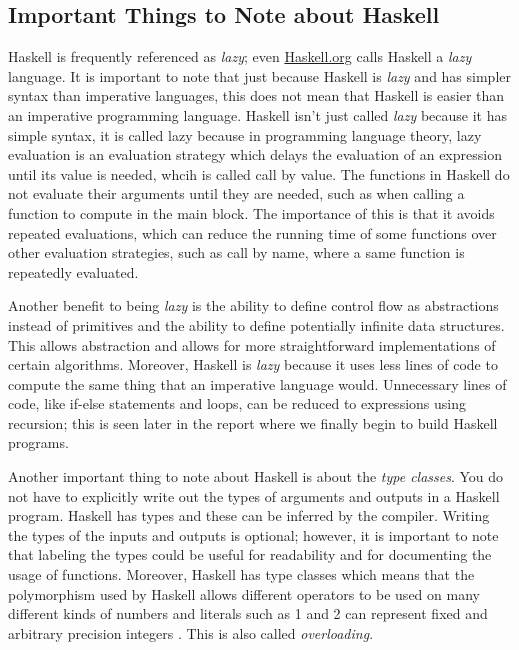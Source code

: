 \documentclass{article}
\begin{document}
\subsection{Important Things to Note about Haskell}
Haskell is frequently referenced as \textit{lazy}; even \href{https://www.haskell.org}{Haskell.org} calls Haskell a \textit{lazy} language. It is important to note that just because Haskell is \textit{lazy} and has simpler syntax than imperative languages, this does not mean that Haskell is easier than an imperative programming language. Haskell isn't just called \textit{lazy} because it has simple syntax, it is called lazy because in programming language theory, lazy evaluation is an evaluation strategy which delays the evaluation of an expression until its value is needed, whcih is called call by value\cite{20}. The functions in Haskell do not evaluate their arguments until they are needed, such as when calling a function to compute in the main block. The importance of this is that it avoids repeated evaluations, which can reduce the running time of some functions over other evaluation strategies, such as call by name, where a same function is repeatedly evaluated. 

\vspace{\baselineskip}
Another benefit to being \textit{lazy} is the ability to define control flow as abstractions instead of primitives and the ability to define potentially infinite data structures. This allows abstraction and allows for more straightforward implementations of certain algorithms. Moreover, Haskell is \textit{lazy} because it uses less lines of code to compute the same thing that an imperative language would. Unnecessary lines of code, like if-else statements and loops, can be reduced to expressions using recursion; this is seen later in the report where we finally begin to build Haskell programs.

\vspace{\baselineskip}
Another important thing to note about Haskell is about the \textit{type classes}. You do not have to explicitly write out the types of arguments and outputs in a Haskell program. Haskell has types and these can be inferred by the compiler. Writing the types of the inputs and outputs is optional; however, it is important to note that labeling the types could be useful for readability and for documenting the usage of functions. Moreover, Haskell has type classes which means that the polymorphism used by Haskell allows different operators to be used on many different kinds of numbers and literals such as 1 and 2 can represent fixed and arbitrary precision integers \cite{3}. This is also called \textit{overloading}.
\end{document}
